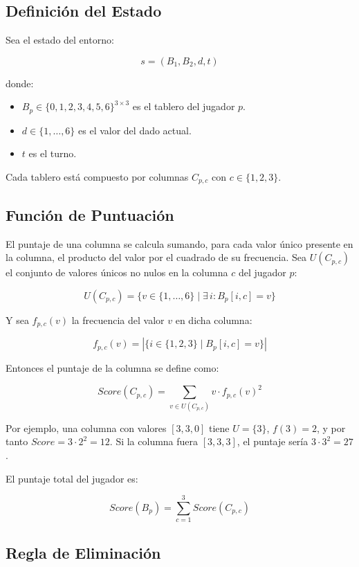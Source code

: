 \subsection{Definición del Estado}

Sea el estado del entorno:

\[
s = (B_1, B_2, d, t)
\]

donde:

\begin{itemize}
    \item $B_p \in \{0,1,2,3,4,5,6\}^{3 \times 3}$ es el tablero del jugador $p$.
    \item $d \in \{1,\dots,6\}$ es el valor del dado actual.
    \item $t$ es el turno.
\end{itemize}

Cada tablero está compuesto por columnas $C_{p,c}$ con $c \in \{1,2,3\}$.

\subsection{Función de Puntuación}

El puntaje de una columna se calcula sumando, para cada valor único presente en la columna, el producto del valor por el cuadrado de su frecuencia. Sea $U(C_{p,c})$ el conjunto de valores únicos no nulos en la columna $c$ del jugador $p$:

\[
U(C_{p,c}) = \{ v \in \{1,\dots,6\} \mid \exists\, i : B_p[i,c] = v \}
\]

Y sea $f_{p,c}(v)$ la frecuencia del valor $v$ en dicha columna:

\[
f_{p,c}(v) = \left| \{ i \in \{1,2,3\} \mid B_p[i,c] = v \} \right|
\]

Entonces el puntaje de la columna se define como:

\[
Score(C_{p,c}) = \sum_{v \in U(C_{p,c})} v \cdot f_{p,c}(v)^2
\]

Por ejemplo, una columna con valores $[3, 3, 0]$ tiene $U = \{3\}$, $f(3) = 2$, y por tanto $Score = 3 \cdot 2^2 = 12$. Si la columna fuera $[3, 3, 3]$, el puntaje sería $3 \cdot 3^2 = 27$.

El puntaje total del jugador es:

\[
Score(B_p) =
\sum_{c=1}^{3} Score(C_{p,c})
\]

\subsection{Regla de Eliminación}

